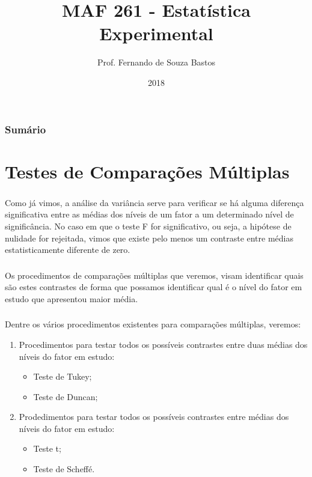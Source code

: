 \documentclass[14pt,aspectratio=1610]{beamer}
\title{MAF 261 - Estatística Experimental}
\author{Prof. Fernando de Souza Bastos}
\institute{Instituto de Ciências Exatas e Tecnológicas\texorpdfstring{\\ Universidade Federal de Viçosa}{}\texorpdfstring{\\ Campus UFV - Florestal}{}}
\date{2018}
\begin{document}


\frame{\titlepage}

\begin{frame}{}
\frametitle{\bf Sumário}
\tableofcontents
\end{frame}

\section{Testes de Comparações Múltiplas}
\begin{frame}{}
\frametitle{}
\begin{block}{}
\justifying
Como já vimos, a análise da variância serve para verificar se há alguma
diferença significativa entre as médias dos níveis de um fator a um
determinado nível de significância. No caso em que o teste F for 
significativo, ou seja, a hipótese de nulidade for rejeitada, vimos que
existe pelo menos um contraste entre médias estatisticamente diferente 
de zero.
\end{block}
\end{frame}

\begin{frame}{}
\frametitle{}
\begin{block}{}
\justifying
Os procedimentos de comparações múltiplas que veremos, visam identificar quais são estes contrastes de forma que possamos identificar qual é o nível do fator em estudo que apresentou maior média.
\end{block}
\end{frame}

\begin{frame}{}
\frametitle{}
\begin{block}{}
\justifying
Dentre os vários procedimentos existentes para comparações múltiplas, veremos:

\begin{enumerate}
\item Procedimentos para testar todos os possíveis contrastes entre duas médias dos níveis do fator em estudo:
\begin{itemize}
\item Teste de Tukey;\pause
\item Teste de Duncan;\pause
\end{itemize}
\item Prodedimentos para testar todos os possíveis contrastes entre médias dos níveis do fator em estudo:
\begin{itemize}
\item Teste t;\pause
\item Teste de Scheffé.
\end{itemize}
\end{enumerate}
\end{block}
\end{frame}
\end{document}
